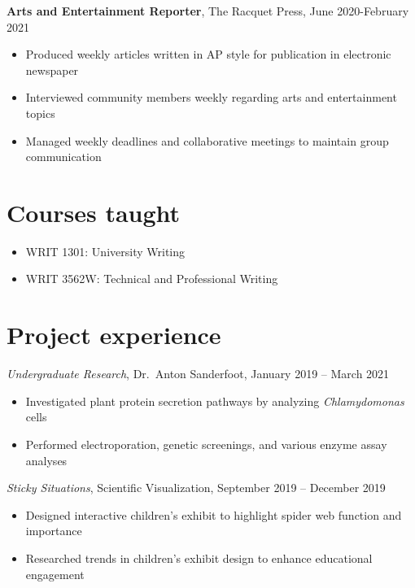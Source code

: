 \documentclass[
]{report}
\providecommand{\tightlist}{%
  \setlength{\itemsep}{0pt}\setlength{\parskip}{0pt}}\usepackage{longtable,booktabs,array}
\begin{document}
\textbf{Arts and Entertainment Reporter}, The Racquet Press, June
2020-February 2021

\begin{itemize}
\tightlist
\item
  Produced weekly articles written in AP style for publication in
  electronic newspaper
\item
  Interviewed community members weekly regarding arts and entertainment
  topics
\item
  Managed weekly deadlines and collaborative meetings to maintain group
  communication
\end{itemize}

\hypertarget{courses-taught}{%
\section{Courses taught}\label{courses-taught}}

\begin{itemize}
\tightlist
\item
  WRIT 1301: University Writing
\item
  WRIT 3562W: Technical and Professional Writing
\end{itemize}

\hypertarget{project-experience}{%
\section{Project experience}\label{project-experience}}

\emph{Undergraduate Research}, Dr.~Anton Sanderfoot, January 2019 --
March 2021

\begin{itemize}
\tightlist
\item
  Investigated plant protein secretion pathways by analyzing
  \emph{Chlamydomonas} cells
\item
  Performed electroporation, genetic screenings, and various enzyme
  assay analyses
\end{itemize}

\emph{Sticky Situations}, Scientific Visualization, September 2019 --
December 2019

\begin{itemize}
\tightlist
\item
  Designed interactive children's exhibit to highlight spider web
  function and importance
\item
  Researched trends in children's exhibit design to enhance educational
  engagement
\end{itemize}
\end{document}

